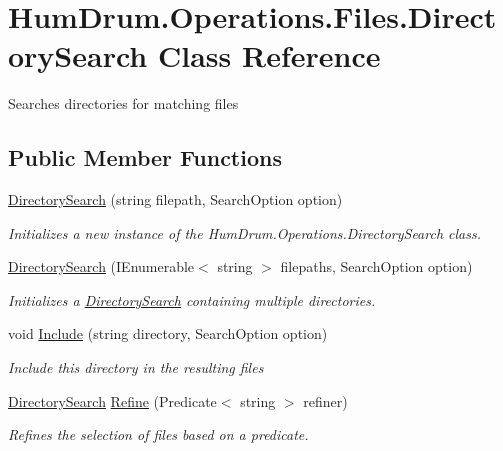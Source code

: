 \hypertarget{classHumDrum_1_1Operations_1_1Files_1_1DirectorySearch}{}\section{Hum\+Drum.\+Operations.\+Files.\+Directory\+Search Class Reference}
\label{classHumDrum_1_1Operations_1_1Files_1_1DirectorySearch}


Searches directories for matching files  


\subsection*{Public Member Functions}
\begin{DoxyCompactItemize}
\item 
\hyperlink{classHumDrum_1_1Operations_1_1Files_1_1DirectorySearch_a0f89c3520fbeff9824802b3c56f0028d}{Directory\+Search} (string filepath, Search\+Option option)
\begin{DoxyCompactList}\small\item\em Initializes a new instance of the Hum\+Drum.\+Operations.\+Directory\+Search class. \end{DoxyCompactList}\item 
\hyperlink{classHumDrum_1_1Operations_1_1Files_1_1DirectorySearch_a71545ff9227fa57dc696fed8e9f0c639}{Directory\+Search} (I\+Enumerable$<$ string $>$ filepaths, Search\+Option option)
\begin{DoxyCompactList}\small\item\em Initializes a \hyperlink{classHumDrum_1_1Operations_1_1Files_1_1DirectorySearch}{Directory\+Search} containing multiple directories. \end{DoxyCompactList}\item 
void \hyperlink{classHumDrum_1_1Operations_1_1Files_1_1DirectorySearch_a8c2e6b3858b3be6637ec872bb558c678}{Include} (string directory, Search\+Option option)
\begin{DoxyCompactList}\small\item\em Include this directory in the resulting files \end{DoxyCompactList}\item 
\hyperlink{classHumDrum_1_1Operations_1_1Files_1_1DirectorySearch}{Directory\+Search} \hyperlink{classHumDrum_1_1Operations_1_1Files_1_1DirectorySearch_a053a117d9a66d3d9098c92dd9f50645a}{Refine} (Predicate$<$ string $>$ refiner)
\begin{DoxyCompactList}\small\item\em Refines the selection of files based on a predicate. \end{DoxyCompactList}\item 

\end{DoxyCompactItemize}
